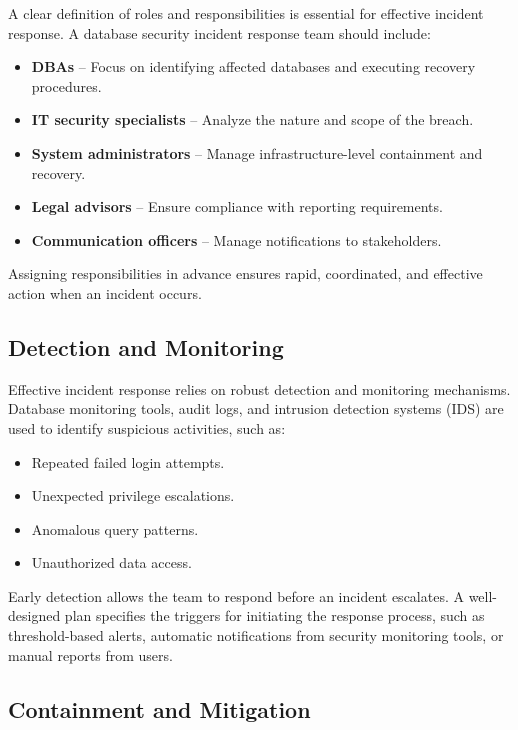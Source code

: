 \documentclass[12pt,a4paper]{article}
\begin{document}
A clear definition of roles and responsibilities is essential for effective incident response. A database security incident response team should include:

\begin{itemize}
  \item \textbf{DBAs} -- Focus on identifying affected databases and executing recovery procedures.
  \item \textbf{IT security specialists} -- Analyze the nature and scope of the breach.
  \item \textbf{System administrators} -- Manage infrastructure-level containment and recovery.
  \item \textbf{Legal advisors} -- Ensure compliance with reporting requirements.
  \item \textbf{Communication officers} -- Manage notifications to stakeholders.
\end{itemize}

Assigning responsibilities in advance ensures rapid, coordinated, and effective action when an incident occurs.

\subsection{Detection and Monitoring}

Effective incident response relies on robust detection and monitoring mechanisms. Database monitoring tools, audit logs, and intrusion detection systems (IDS) are used to identify suspicious activities, such as:

\begin{itemize}
  \item Repeated failed login attempts.
  \item Unexpected privilege escalations.
  \item Anomalous query patterns.
  \item Unauthorized data access.
\end{itemize}

Early detection allows the team to respond before an incident escalates. A well-designed plan specifies the triggers for initiating the response process, such as threshold-based alerts, automatic notifications from security monitoring tools, or manual reports from users.

\subsection{Containment and Mitigation}
\end{document}
